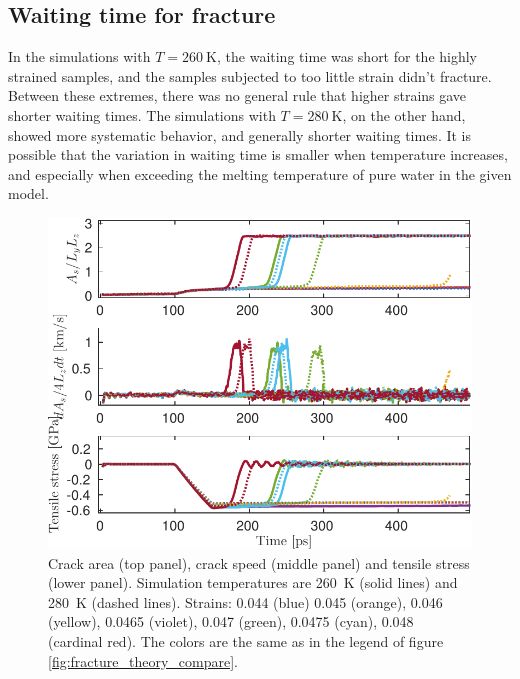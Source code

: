 \subsection{Waiting time for fracture}
In the simulations with $T=\SI{260}{\kelvin}$, the waiting time was short for the highly strained samples, and the samples subjected to too little strain didn't fracture. Between these extremes, there was no general rule that higher strains gave shorter waiting times. The simulations with $T=\SI{280}{\kelvin}$, on the other hand, showed more systematic behavior, and generally shorter waiting times. It is possible that the variation in waiting time is smaller when temperature increases, and especially when exceeding the melting temperature of pure water in the given model.

\begin{figure}
\centering
\includegraphics[width=12cm]{../figures/thesis/area_speed_stress_all.pdf}
\caption{Crack area (top panel), crack speed (middle panel) and tensile stress (lower panel). Simulation temperatures are \SI{260}{\kelvin} (solid lines) and \SI{280}{\kelvin} (dashed lines). Strains: 0.044 (blue) 0.045 (orange), 0.046 (yellow), 0.0465 (violet), 0.047 (green), 0.0475 (cyan), 0.048 (cardinal red). The colors are the same as in the legend of figure \ref{fig:fracture_theory_compare}. }
\label{fig:area_speed_stress_all}
\end{figure}

